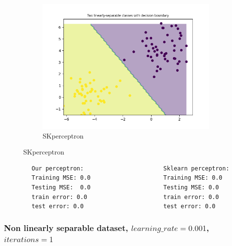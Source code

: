 \begin{figure}[ht]
\begin{subfigure}{0.4\textwidth}
            \includegraphics[width=\linewidth]{code/plots/SKperceptron_LR0.001_ITER1_dataset_loaddata}
            \caption{SKperceptron}
            \label{fig:image2}
        \end{subfigure}
        \label{fig:overall}
    \end{figure}

    \begin{verbatim}    
        Our perceptron:                       Sklearn perceptron:
        Training MSE: 0.0                     Training MSE: 0.0
        Testing MSE:  0.0                     Testing MSE: 0.0
        train error: 0.0                      train error: 0.0
        test error: 0.0                       test error: 0.0
    \end{verbatim}

    \subsubsection{Non linearly separable dataset, $learning\_rate=0.001$, $iterations=1$}


